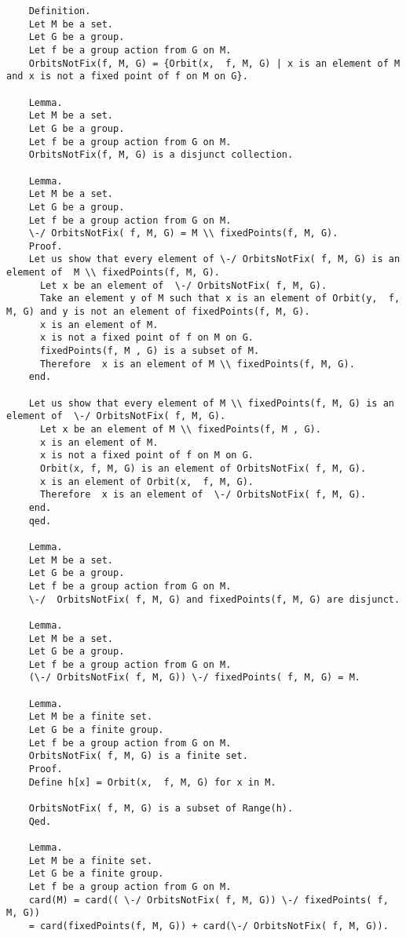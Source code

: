 \documentclass[a4paper,12pt]{scrartcl}
\begin{document}
\begin{lstlisting}
	Definition.
	Let M be a set.
	Let G be a group.
	Let f be a group action from G on M.
	OrbitsNotFix(f, M, G) = {Orbit(x,  f, M, G) | x is an element of M and x is not a fixed point of f on M on G}.
	
	Lemma.
	Let M be a set.
	Let G be a group.
	Let f be a group action from G on M.
	OrbitsNotFix(f, M, G) is a disjunct collection.
	
	Lemma.
	Let M be a set.
	Let G be a group.
	Let f be a group action from G on M.
	\-/ OrbitsNotFix( f, M, G) = M \\ fixedPoints(f, M, G).
	Proof.
	Let us show that every element of \-/ OrbitsNotFix( f, M, G) is an element of  M \\ fixedPoints(f, M, G).
	  Let x be an element of  \-/ OrbitsNotFix( f, M, G).
	  Take an element y of M such that x is an element of Orbit(y,  f, M, G) and y is not an element of fixedPoints(f, M, G).
	  x is an element of M.
	  x is not a fixed point of f on M on G.
	  fixedPoints(f, M , G) is a subset of M.
	  Therefore  x is an element of M \\ fixedPoints(f, M, G).
	end.
	
	Let us show that every element of M \\ fixedPoints(f, M, G) is an element of  \-/ OrbitsNotFix( f, M, G).
	  Let x be an element of M \\ fixedPoints(f, M , G).
	  x is an element of M.
	  x is not a fixed point of f on M on G.
	  Orbit(x, f, M, G) is an element of OrbitsNotFix( f, M, G).
	  x is an element of Orbit(x,  f, M, G).
	  Therefore  x is an element of  \-/ OrbitsNotFix( f, M, G).
	end.
	qed.
	
	Lemma.
	Let M be a set.
	Let G be a group.
	Let f be a group action from G on M.
	\-/  OrbitsNotFix( f, M, G) and fixedPoints(f, M, G) are disjunct.
	
	Lemma.
	Let M be a set.
	Let G be a group.
	Let f be a group action from G on M.
	(\-/ OrbitsNotFix( f, M, G)) \-/ fixedPoints( f, M, G) = M.
	
	Lemma.
	Let M be a finite set.
	Let G be a finite group.
	Let f be a group action from G on M.
	OrbitsNotFix( f, M, G) is a finite set.
	Proof.
	Define h[x] = Orbit(x,  f, M, G) for x in M.
	
	OrbitsNotFix( f, M, G) is a subset of Range(h).
	Qed.
	
	Lemma.
	Let M be a finite set.
	Let G be a finite group.
	Let f be a group action from G on M.
	card(M) = card(( \-/ OrbitsNotFix( f, M, G)) \-/ fixedPoints( f, M, G)) 
	= card(fixedPoints(f, M, G)) + card(\-/ OrbitsNotFix( f, M, G)).
	

\end{lstlisting}
\end{document}
